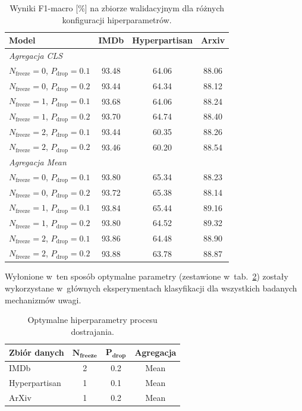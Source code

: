 \documentclass[a4paper,11pt,twoside]{report}
\theoremstyle{definition}
\begin{document}
\begin{table}[t!]
\centering
\caption{Wyniki F1-macro [\%] na zbiorze walidacyjnym dla różnych konfiguracji hiperparametrów.}
\smallskip
\label{tab:e1-f1-results-full}
\small
\begin{tabular}{@{}lccc@{}}
\toprule
\textbf{Model} & \textbf{IMDb} & \textbf{Hyperpartisan} & \textbf{Arxiv} \\
\midrule
\multicolumn{4}{l}{\textit{Agregacja CLS}} \\
$N_\text{freeze}=0$, $P_\text{drop}=0.1$ & 93.48 & 64.06 & 88.06 \\
$N_\text{freeze}=0$, $P_\text{drop}=0.2$ & 93.44 & 64.34 & 88.12 \\
$N_\text{freeze}=1$, $P_\text{drop}=0.1$ & 93.68 & 64.06 & 88.24 \\
$N_\text{freeze}=1$, $P_\text{drop}=0.2$ & 93.70 & 64.74 & 88.40 \\
$N_\text{freeze}=2$, $P_\text{drop}=0.1$ & 93.44 & 60.35 & 88.26 \\
$N_\text{freeze}=2$, $P_\text{drop}=0.2$ & 93.46 & 60.20 & 88.54 \\
\midrule
\multicolumn{4}{l}{\textit{Agregacja Mean}} \\
$N_\text{freeze}=0$, $P_\text{drop}=0.1$ & 93.80 & 65.34 & 88.23 \\
$N_\text{freeze}=0$, $P_\text{drop}=0.2$ & 93.72 & 65.38 & 88.14 \\
$N_\text{freeze}=1$, $P_\text{drop}=0.1$ & 93.84 & 65.44 & 89.16 \\
$N_\text{freeze}=1$, $P_\text{drop}=0.2$ & 93.80 & 64.52 & 89.32 \\
$N_\text{freeze}=2$, $P_\text{drop}=0.1$ & 93.86 & 64.48 & 88.90 \\
$N_\text{freeze}=2$, $P_\text{drop}=0.2$ & 93.88 & 63.78 & 88.87 \\
\bottomrule
\end{tabular}
\end{table}


Wyłonione w~ten sposób optymalne parametry (zestawione w~tab.~\ref{tab:e1-results}) zostały wykorzystane w~głównych eksperymentach klasyfikacji dla wszystkich badanych mechanizmów uwagi.

\begin{table}[t!]
\centering
\caption{Optymalne hiperparametry procesu dostrajania.}
\smallskip
\label{tab:e1-results}
\begin{tabular}{@{}lccc@{}}
\toprule
\textbf{Zbiór danych} & $\boldsymbol{N_{freeze}}$ & $\boldsymbol{P_{drop}}$ & \textbf{Agregacja} \\
\midrule
IMDb          & 2   & 0.2 & Mean \\
Hyperpartisan & 1  & 0.1  & Mean   \\
ArXiv         & 1  & 0.2  & Mean   \\
\bottomrule
\end{tabular}
\end{table}
\end{document}
